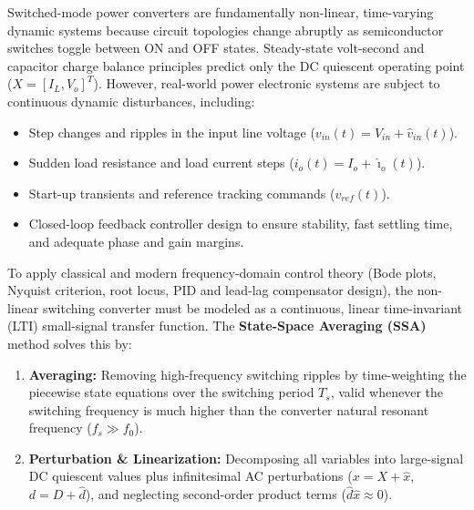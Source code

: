\vspace{0.5em}
\noindent Switched-mode power converters are fundamentally non-linear, time-varying dynamic systems because circuit topologies change abruptly as semiconductor switches toggle between ON and OFF states. Steady-state volt-second and capacitor charge balance principles predict only the DC quiescent operating point ($X = [I_L, V_o]^T$). However, real-world power electronic systems are subject to continuous dynamic disturbances, including:
\begin{itemize}
  \item Step changes and ripples in the input line voltage ($v_{in}(t) = V_{in} + \hat{v}_{in}(t)$).
  \item Sudden load resistance and load current steps ($i_o(t) = I_o + \hat{\imath}_o(t)$).
  \item Start-up transients and reference tracking commands ($v_{ref}(t)$).
  \item Closed-loop feedback controller design to ensure stability, fast settling time, and adequate phase and gain margins.
\end{itemize}
To apply classical and modern frequency-domain control theory (Bode plots, Nyquist criterion, root locus, PID and lead-lag compensator design), the non-linear switching converter must be modeled as a continuous, linear time-invariant (LTI) small-signal transfer function. The \textbf{State-Space Averaging (SSA)} method solves this by:
\begin{enumerate}
  \item \textbf{Averaging:} Removing high-frequency switching ripples by time-weighting the piecewise state equations over the switching period $T_s$, valid whenever the switching frequency is much higher than the converter natural resonant frequency ($f_s \gg f_0$).
  \item \textbf{Perturbation \& Linearization:} Decomposing all variables into large-signal DC quiescent values plus infinitesimal AC perturbations ($x = X + \hat{x}$, $d = D + \hat{d}$), and neglecting second-order product terms ($\hat{d}\hat{x} \approx 0$).
\end{enumerate}

